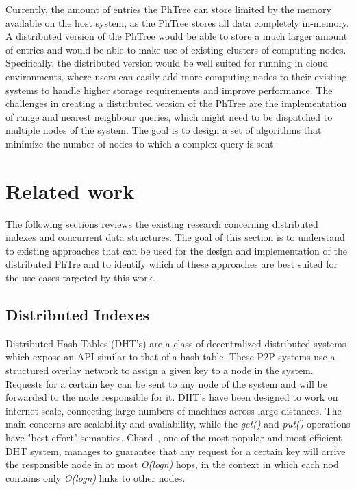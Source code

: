 \documentclass[11pt,a4paper]{globis-book}
\begin{document}
Currently, the amount of entries the PhTree can store limited by the memory available on the host system, as the PhTree stores all data completely in-memory. A distributed version of the PhTree would be able to store a much larger amount of entries and would be able to make use of existing clusters of computing nodes. Specifically, the distributed version would be well suited for running in cloud environments, where users can easily add more computing nodes to their existing systems to handle higher storage requirements and improve performance. The challenges in creating a distributed version of the PhTree are the implementation of range and nearest neighbour queries, which might need to be dispatched to multiple nodes of the system. The goal is to design a set of algorithms that minimize the number of nodes to which a complex query is sent.

\section{Related work}
\label{sec:background-rw}

The following sections reviews the existing research concerning distributed indexes and concurrent data structures. The goal of this section is to understand to existing approaches that can be used for the design and implementation of the distributed PhTre and to identify which of these approaches are best suited for the use cases targeted by this work.
\subsection{Distributed Indexes}

Distributed Hash Tables (DHT's) are a class of decentralized distributed systems which expose an API similar to that of a hash-table. These P2P systems use a structured overlay network to assign a given key to a node in the system. Requests for a certain key can be sent to any node of the system and will be forwarded to the node responsible for it. DHT's have been designed to work on internet-scale, connecting large numbers of machines across large distances. The main concerns are scalability and availability, while the \textit{get()} and \textit{put()} operations have "best effort" semantics. Chord~\cite{Stoica2001chord}, one of the most popular and most efficient DHT system, manages to guarantee that any request for a certain key will arrive the responsible node in at most \textit{O(logn)} hops, in the context in which each nod contains only \textit{O(logn)} links to other nodes. 
\end{document}
